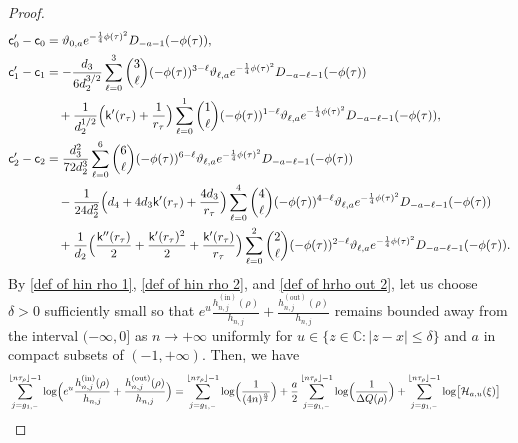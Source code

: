 \documentclass[reqno]{amsart}
\newcommand{\1}{\mathds{1}}
\newcommand{\C}{\mathds{C}}
\numberwithin{equation}{section}
\theoremstyle{definition}
\begin{document}
\begin{proof}
\begin{align*}
\mathsf{c}_0'-\mathsf{c}_0
&=
\vartheta_{0,a}e^{-\frac{1}{4}\phi(\tau)^2}
D_{-a-1}(-\phi(\tau)), 
\\
\mathsf{c}_1'-\mathsf{c}_1
&=
-\frac{d_3}{6d_2^{3/2}}\sum_{\ell=0}^{3}\binom{3}{\ell}(-\phi(\tau))^{3-\ell}
\vartheta_{\ell,a}e^{-\frac{1}{4}\phi(\tau)^2}
D_{-a-\ell-1}(-\phi(\tau))
\\ &\quad
+\frac{1}{d_2^{1/2}}\Bigl(\mathsf{k}'(r_{\tau})+\frac{1}{r_{\tau}}\Bigr)
\sum_{\ell=0}^{1}\binom{1}{\ell}(-\phi(\tau))^{1-\ell}
\vartheta_{\ell,a}e^{-\frac{1}{4}\phi(\tau)^2}
D_{-a-\ell-1}(-\phi(\tau)), 
\\
\mathsf{c}_2'-\mathsf{c}_2
&=    
\frac{d_3^2}{72d_2^3}
\sum_{\ell=0}^{6}\binom{6}{\ell}(-\phi(\tau))^{6-\ell}
\vartheta_{\ell,a}e^{-\frac{1}{4}\phi(\tau)^2}
D_{-a-\ell-1}(-\phi(\tau))
\\
&\quad
-
\frac{1}{24d_2^2}\Bigl(d_4+4d_3\mathsf{k}'(r_{\tau})+\frac{4d_3}{r_{\tau}}\Bigr)
\sum_{\ell=0}^{4}\binom{4}{\ell}(-\phi(\tau))^{4-\ell}
\vartheta_{\ell,a}e^{-\frac{1}{4}\phi(\tau)^2}
D_{-a-\ell-1}(-\phi(\tau))
\\
&\quad
+
\frac{1}{d_2}\Bigl(\frac{\mathsf{k}''(r_{\tau})}{2}+\frac{\mathsf{k}'(r_{\tau})^2}{2}+\frac{\mathsf{k}'(r_{\tau})}{r_{\tau}}\Bigr)
\sum_{\ell=0}^{2}\binom{2}{\ell}(-\phi(\tau))^{2-\ell}
\vartheta_{\ell,a}e^{-\frac{1}{4}\phi(\tau)^2}
D_{-a-\ell-1}(-\phi(\tau)). 
\end{align*}
By \eqref{def of hin rho 1}, \eqref{def of hin rho 2}, and \eqref{def of hrho out 2}, let us choose $\delta>0$ sufficiently small so that $e^{u}\frac{h_{n,j}^{(\mathrm{in})}(\rho)}{h_{n,j}}+\frac{h_{n,j}^{(\mathrm{out})}(\rho)}{h_{n,j}}$ remains bounded away from the interval $(-\infty,0]$ as $n\to+\infty$ uniformly for $u\in\{z\in\C:|z-x|\leq \delta\}$ and $a$ in compact subsets of $(-1,+\infty)$. 
Then, we have 
\begin{align}
\begin{split}
\label{def of S2 first part}    
\sum_{j=g_{1,-}}^{\lfloor n\tau_{\rho}\rfloor -1}
\log\Bigl(e^{u}\frac{h_{n,j}^{(\mathrm{in})}(\rho)}{h_{n,j}}+\frac{h_{n,j}^{(\mathrm{out})}(\rho)}{h_{n,j}}\Bigr)
&=
\sum_{j=g_{1,-}}^{\lfloor n\tau_{\rho}\rfloor -1}\log\Bigl(\frac{1}{(4n)^{\frac{a}{2}}}\Bigr)
+
\frac{a}{2}\sum_{j=g_{1,-}}^{\lfloor n\tau_{\rho}\rfloor -1}\log\Bigl(\frac{1}{\Delta Q(\rho)}\Bigr)
+
\sum_{j=g_{1,-}}^{\lfloor n\tau_{\rho}\rfloor -1}\log \bigl[\mathcal{H}_{a,u}(\xi)\bigr]

\end{split}
\end{align}
\end{proof}
\end{document}
